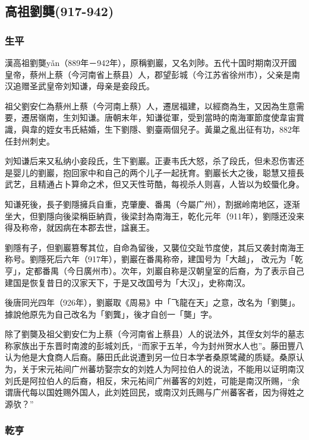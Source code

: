 
\subsection{高祖劉龑\tiny(917-942)}

\subsubsection{生平}

漢高祖劉龑yǎn（889年－942年），原稱劉巖，又名刘陟。五代十国时期南汉开國皇帝，蔡州上蔡（今河南省上蔡县）人，郡望彭城（今江苏省徐州市），父亲是南汉追赠圣武皇帝刘知谦，母亲是妾段氏。

祖父劉安仁為蔡州上蔡（今河南上蔡）人，遷居福建，以經商為生，又因為生意需要，遷居嶺南，生刘知谦。唐朝末年，知谦從軍，受到當時的南海軍節度使韋宙賞識，與韋的姪女韦氏結婚，生下劉隱、劉臺兩個兒子。黃巢之亂出征有功，882年任封州刺史。

刘知谦后来又私纳小妾段氏，生下劉巖。正妻韦氏大怒，杀了段氏，但未忍伤害还是婴儿的劉巖，抱回家中和自己的两个儿子一起抚育。劉巖长大之後，聪慧又擅長武艺，且精通占卜算命之术，但又天性苛酷，每视杀人则喜，人皆以为蛟蜃化身。

知谦死後，長子劉隱擁兵自重，克肇慶、番禺（今屬广州），割据岭南地区，逐渐坐大，但劉隱向後梁稱臣納貢，後梁封為南海王，乾化元年（911年），劉隱还没来得及称帝，就因病在本郡去世，諡襄王。

劉隱有子，但劉巖篡奪其位，自命為留後，又襲位交趾节度使，其后又袭封南海王称号。劉隱死后六年（917年），劉巖在番禺称帝，建国号为「大越」， 改元为「乾亨」，定都番禺（今日廣州市）。次年，刘巖自称是汉朝皇室的后裔，为了表示自己建国是恢复昔日的汉家天下，于是又改国号为「大汉」，史称南汉。

後唐同光四年（926年），劉巖取《周易》中「飞龍在天」之意，改名为「劉龑」。據說他原先为自己改名为「劉龔」，後才自创一「龑」字。

除了劉龑及祖父劉安仁为上蔡（今河南省上蔡县）人的说法外，其侄女刘华的墓志称家族出于东晋时南渡的彭城刘氏，“而家于五羊，今为封州贺水人也”。藤田豐八认为他是大食商人后裔。藤田氏此说遭到另一位日本学者桑原骘藏的质疑。桑原认为，关于宋元祐间广州蕃坊娶宗女的刘姓人为阿拉伯人的说法，不能用以证明南汉刘氏是阿拉伯人的后裔，相反，宋元祐间广州蕃客的刘姓，可能是南汉所赐，“余谓唐代每以国姓赐外国人，此刘姓回民，或南汉刘氏赐与广州蕃客者，因为得姓之源欤？”

\subsubsection{乾亨}

